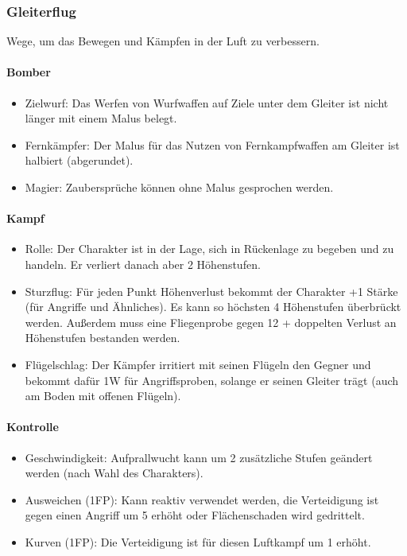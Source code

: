 \documentclass{article}
\begin{document}
\subsubsection{Gleiterflug}

Wege, um das Bewegen und Kämpfen in der Luft zu verbessern.

\paragraph{Bomber}

\begin{itemize}
\item Zielwurf: Das Werfen von Wurfwaffen auf Ziele unter dem Gleiter ist nicht länger mit einem Malus belegt.
\item Fernkämpfer: Der Malus für das Nutzen von Fernkampfwaffen am Gleiter ist halbiert (abgerundet).
\item Magier: Zaubersprüche können ohne Malus gesprochen werden.
\end{itemize}

\paragraph{Kampf}

\begin{itemize}
\item Rolle: Der Charakter ist in der Lage, sich in Rückenlage zu begeben und zu handeln. Er verliert danach aber 2 Höhenstufen.
\item Sturzflug: Für jeden Punkt Höhenverlust bekommt der Charakter +1 Stärke (für Angriffe und Ähnliches). Es kann so höchsten 4 Höhenstufen überbrückt werden. Außerdem muss eine Fliegenprobe gegen 12 + doppelten Verlust an Höhenstufen bestanden werden.
\item Flügelschlag: Der Kämpfer irritiert mit seinen Flügeln den Gegner und bekommt dafür 1W für Angriffsproben, solange er seinen Gleiter trägt (auch am Boden mit offenen Flügeln).
\end{itemize}

\paragraph{Kontrolle}

\begin{itemize}
\item Geschwindigkeit: Aufprallwucht kann um 2 zusätzliche Stufen geändert werden (nach Wahl des Charakters).
\item Ausweichen (1FP): Kann reaktiv verwendet werden, die Verteidigung ist gegen einen Angriff um 5 erhöht oder Flächenschaden wird gedrittelt.
\item Kurven (1FP): Die Verteidigung ist für diesen Luftkampf um 1 erhöht.
\end{itemize}
\end{document}
